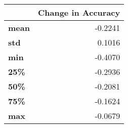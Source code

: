 \begin{tabular}{lr}
\toprule
{} &  Change in Accuracy \\
\midrule
\textbf{mean} &             -0.2241 \\
\textbf{std } &              0.1016 \\
\textbf{min } &             -0.4070 \\
\textbf{25\% } &             -0.2936 \\
\textbf{50\% } &             -0.2081 \\
\textbf{75\% } &             -0.1624 \\
\textbf{max } &             -0.0679 \\
\bottomrule
\end{tabular}
